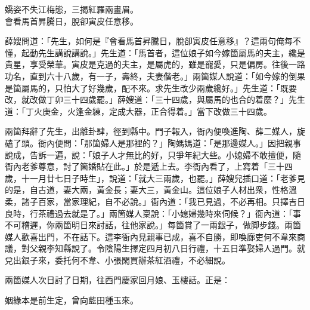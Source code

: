 \begin{myquote}
嬌姿不失江梅態，三揭紅羅兩畫眉。\\會看馬首昇騰日，脫卻寅皮任意移。
\end{myquote}

薛嫂問道：「先生，如何是『會看馬首昇騰日，脫卻寅皮任意移』？這兩句俺每不懂，起動先生講說講說。」先生道：「馬首者，這位娘子如今嫁箇屬馬的夫主，纔是貴星，享受榮華。寅皮是克過的夫主，是屬虎的，雖是寵愛，只是偏房。往後一路功名，直到六十八歲，有一子，壽終，夫妻偕老。」兩箇媒人說道：「如今嫁的倒果是箇屬馬的，只怕大了好幾歲，配不來。求先生改少兩歲纔好。」先生道：「既要改，就改做丁卯三十四歲罷。」薛嫂道：「三十四歲，與屬馬的也合的着麼？」先生道：「丁火庚金，火逢金練，定成大器，正合得着。」當下改做三十四歲。

兩箇拜辭了先生，出離卦肆，徑到縣中。門子報入，衙內便喚進陶、薛二媒人，旋磕了頭。衙內便問：「那箇婦人是那裡的？」陶媽媽道：「是那邊媒人。」因把親事說成，告訴一遍，說：「娘子人才無比的好，只爭年紀大些。小媳婦不敢擅便，隨衙內老爹尊意，討了箇婚貼在此。」於是遞上去。李衙內看了，上寫着「三十四歲，十一月廿七日子時生」，說道：「就大三兩歲，也罷。」薛嫂兒插口道：「老爹見的是，自古道，妻大兩，黃金長；妻大三，黃金山。{}這位娘子人材出衆，性格溫柔，諸子百家，當家理紀，自不必說。」衙內道：「我已見過，不必再相。只擇吉日良時，行茶禮過去就是了。」兩箇媒人稟說：「小媳婦幾時來伺候？」衙內道：「事不可稽遲，你兩箇明日來討話，往他家說。」每箇賞了一兩銀子，做脚步錢。兩箇媒人歡喜出門，不在話下。這李衙內見親事已成，喜不自勝，即喚廊吏何不韋來商議，對父親李知縣說了。令陰陽生擇定四月初八日行禮，十五日準娶婦人過門。就兌出銀子來，委托何不韋、小張閑買辦茶紅酒禮，不必細說。

兩箇媒人次日討了日期，往西門慶家回月娘、玉樓話。正是：

\begin{myquote}
姻緣本是前生定，曾向藍田種玉來。
\end{myquote}

